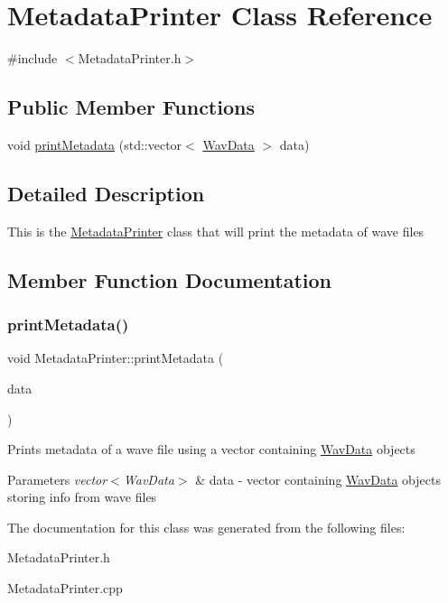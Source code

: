 \hypertarget{classMetadataPrinter}{}\section{Metadata\+Printer Class Reference}
\label{classMetadataPrinter}


{\ttfamily \#include $<$Metadata\+Printer.\+h$>$}

\subsection*{Public Member Functions}
\begin{DoxyCompactItemize}
\item 
void \hyperlink{classMetadataPrinter_a24c7e76188fcb3a0d5ad7e4dae631431}{print\+Metadata} (std\+::vector$<$ \hyperlink{classWavData}{Wav\+Data} $>$ data)
\end{DoxyCompactItemize}


\subsection{Detailed Description}
This is the \hyperlink{classMetadataPrinter}{Metadata\+Printer} class that will print the metadata of wave files 

\subsection{Member Function Documentation}
\mbox{\label{classMetadataPrinter_a24c7e76188fcb3a0d5ad7e4dae631431}} 
\subsubsection{\texorpdfstring{print\+Metadata()}{printMetadata()}}
{\footnotesize\ttfamily void Metadata\+Printer\+::print\+Metadata (\begin{DoxyParamCaption}\item[{std\+::vector$<$ \hyperlink{classWavData}{Wav\+Data} $>$}]{data }\end{DoxyParamCaption})}

Prints metadata of a wave file using a vector containing \hyperlink{classWavData}{Wav\+Data} objects 
\begin{DoxyParams}{Parameters}
{\em vector$<$\+Wav\+Data$>$} & data -\/ vector containing \hyperlink{classWavData}{Wav\+Data} objects storing info from wave files \\
\hline
\end{DoxyParams}


The documentation for this class was generated from the following files\+:\begin{DoxyCompactItemize}
\item 
Metadata\+Printer.\+h\item 
Metadata\+Printer.\+cpp\end{DoxyCompactItemize}
